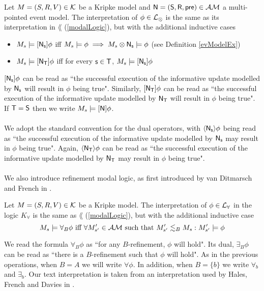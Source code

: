 \begin{defn} \label{actModelLogic}
Let $M = (S, R, V) \in \mathcal{K}$ be a Kripke model and $\mathrm{\mathsf{\mathrm{\mathsf{N}}
  = (S, R, pre)}} \in
\mathcal{AM}$ a multi-pointed event model.
The interpretation of $\phi \in \mathcal{L}_{\otimes}$ is the same as its interpretation in $\lang$
(\ref{modalLogic}), but with the additional
inductive cases
\begin{itemize}
	\item $M_s \models [{\mathrm{\mathsf{\mathrm{\mathsf{N}}_s}}}] \phi$ iff $M_s \models
  \phi \implies M_s \otimes \mathrm{\mathsf{\mathrm{\mathsf{N}}_s}} \models
	\phi$ (see Definition \ref{evModelEx})
	\item $M_s \models [{\mathrm{\mathsf{\mathrm{\mathsf{N}}_T}}}] \phi$ iff for every $\mathrm{\mathsf{s
    \in T}}$, $M_s \models [{\mathrm{\mathsf{\mathrm{\mathsf{N}}_s}}}] \phi$ 
\end{itemize}
\end{defn}
$[{\mathrm{\mathsf{\mathrm{\mathsf{N}}_s}}}] \phi$ can be read as ``the successful execution of the informative update modelled by
$\mathrm{\mathsf{\mathrm{\mathsf{N}}_s}}$ will result in $\phi$ being true".
Similarly, $[{\mathrm{\mathsf{\mathrm{\mathsf{N}}_T}}}] \phi$ can be read as ``the successful execution of the informative update
modelled by $\mathrm{\mathsf{\mathrm{\mathsf{N}}_T}}$ will result in $\phi$ being true".
If $\mathrm{\mathsf{T = S}}$ then we write $M_s \models [{\mathrm{\mathsf{\mathrm{\mathsf{N}}}}}] \phi$.\\
\\
We adopt the standard convention for the dual operators, with $\langle {
   \ensuremath {\mathrm{\mathsf{\mathrm{\mathsf{N}}_s}}}  } \rangle \phi$ being
read as ``the successful execution of the informative update modelled by
$\mathrm{\mathsf{\mathrm{\mathsf{N}}_s}}$ may result in
$\phi$ being true".
Again, $\langle {  \ensuremath {\mathrm{\mathsf{\mathrm{\mathsf{N}}_T}}}  } \rangle \phi$ can be read as ``the successful execution of the informative
update modelled by $\mathrm{\mathsf{\mathrm{\mathsf{N}}_T}}$ may result in $\phi$ being true".\\
\\
We also introduce refinement modal logic, as first introduced by van Ditmarsch and French in
\cite{van2009simulation}.

\begin{defn} \label{refineLogic}
Let $M = (S, R, V) \in \mathcal{K}$ be a Kripke model.
The interpretation of $\phi \in \mathcal{L}_{\forall}$ in the logic $K_\forall$ is the same as $\lang$
(\ref{modalLogic}), but with the additional inductive case
\[
	M_s \models \forall_B \phi \text{ iff } \forall M'_{s'} \in
  \mathcal{AM} \text{ such that } M'_{s'}
	\lesssim_B M_s : M'_{s'} \models \phi
\]
\end{defn}
We read the formula $\forall_B \phi$ as ``for any $B$-refinement, $\phi$ will hold".
Its dual, $\exists_B \phi$ can be read as ``there is a $B$-refinement such that $\phi$ will hold".
As in the previous operations, when $B = A$ we will write $\forall \phi$.
In addition, when $B = \{b\}$ we write $\forall_b$ and $\exists_b$.
Our text interpretation is taken from an interpretation used by Hales, French and Davies in \cite{hales2012refinement}.

